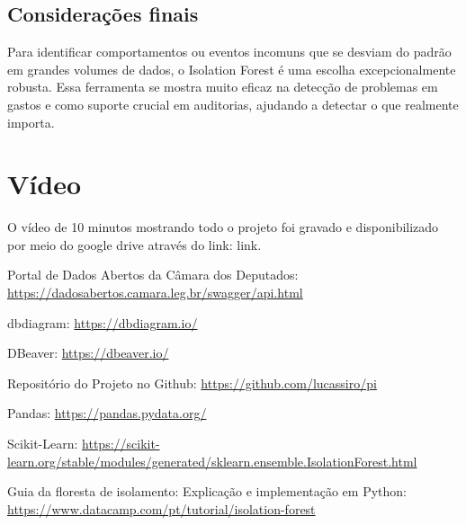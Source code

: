 \documentclass[12pt, a4paper]{article}
\begin{document}
\subsection{Considerações finais}

Para identificar comportamentos ou eventos incomuns que se desviam do padrão em grandes volumes de dados, o Isolation Forest é uma escolha excepcionalmente robusta. Essa ferramenta se mostra muito eficaz na detecção de problemas em gastos e como suporte crucial em auditorias, ajudando a detectar o que realmente importa.

\section{Vídeo}
O vídeo de 10 minutos mostrando todo o projeto foi gravado e disponibilizado por meio do google drive através do link: link.

\begin{thebibliography}{9}
     Portal de Dados Abertos da Câmara dos Deputados: 
    \href{https://dadosabertos.camara.leg.br/swagger/api.html}{https://dadosabertos.camara.leg.br/swagger/api.html}

     dbdiagram: 
    \href{https://dbdiagram.io/}{https://dbdiagram.io/}
    
     DBeaver: 
    \href{https://dbeaver.io/}{https://dbeaver.io/}

     Repositório do Projeto no Github: 
    \href{https://github.com/lucassiro/pi}{https://github.com/lucassiro/pi}
    
     Pandas: 
    \href{https://pandas.pydata.org/}{https://pandas.pydata.org/}
    
     Scikit-Learn: 
    \href{https://scikit-learn.org/stable/modules/generated/sklearn.ensemble.IsolationForest.html}{https://scikit-learn.org/stable/modules/generated/sklearn.ensemble.IsolationForest.html}
    
     Guia da floresta de isolamento: Explicação e implementação em Python: 
    \href{https://www.datacamp.com/pt/tutorial/isolation-forest}{https://www.datacamp.com/pt/tutorial/isolation-forest}
\end{thebibliography}
\end{document}
